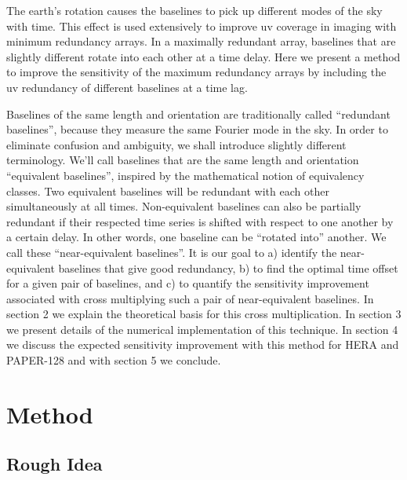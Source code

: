 \documentclass[preprint2,numberedappendix,tighten,twocolappendix]{aastex6}  %
\renewcommand\[{\begin{equation}}
\renewcommand\]{\end{equation}}
\begin{document}
The earth's rotation causes the baselines to pick up different modes of the sky with time. 
This effect is used extensively to improve uv coverage in imaging with minimum redundancy arrays. In
a maximally redundant array, baselines that are slightly different
rotate into each other at a time delay. Here we present a method to
improve the sensitivity of the maximum redundancy arrays by including
the uv redundancy of different baselines at a time lag. 

Baselines of the same length and orientation are traditionally called
``redundant baselines'', because they measure the same Fourier mode
in the sky. In order to eliminate confusion and ambiguity, we shall
introduce slightly different terminology. We'll call baselines that
are the same length and orientation ``equivalent baselines'', inspired
by the mathematical notion of equivalency classes. Two equivalent
baselines will be redundant with each other simultaneously at all
times. Non-equivalent baselines can also be partially redundant if their
respected time series is shifted with respect to one another by a
certain delay. In other words, one baseline can be ``rotated into''
another. We call these ``near-equivalent baselines''. It is our
goal to a) identify the near-equivalent baselines that give good
redundancy, b) to find the optimal time offset for a given pair of baselines, and
c) to quantify the sensitivity improvement associated with cross multiplying
such a pair of near-equivalent baselines. In section
2 we explain the theoretical basis for this cross multiplication.
In section 3 we present details of the numerical implementation of
this technique. In section 4 we discuss the expected sensitivity improvement
with this method for HERA and PAPER-128 and with section 5 we conclude. 


\section{Method}

\subsection{Rough Idea}
\end{document}
